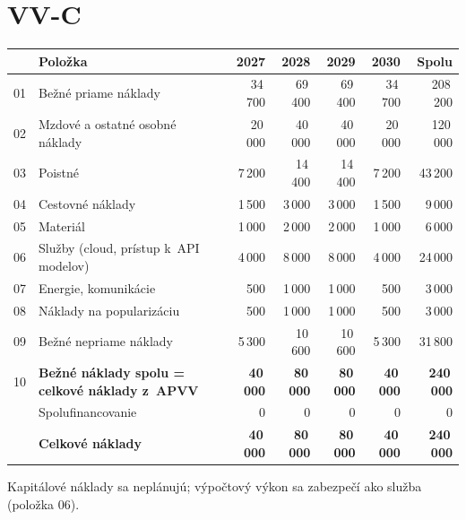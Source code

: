 \documentclass[10pt,a4paper]{article}
\begin{document}
\section*{VV-C }
\renewcommand{\arraystretch}{1.25}
\begin{tabularx}{\textwidth}{|l|X|r|r|r|r|r|}
\hline
\rowcolor{formbg} & \textbf{Položka} & \textbf{2027} & \textbf{2028} & \textbf{2029} & \textbf{2030} & \textbf{Spolu} \\ \hline
01 & Bežné priame náklady & 34\,700 & 69\,400 & 69\,400 & 34\,700 & 208\,200 \\ \hline
02 & \quad Mzdové a ostatné osobné náklady & 20\,000 & 40\,000 & 40\,000 & 20\,000 & 120\,000 \\ \hline
03 & \quad Poistné & 7\,200 & 14\,400 & 14\,400 & 7\,200 & 43\,200 \\ \hline
04 & \quad Cestovné náklady & 1\,500 & 3\,000 & 3\,000 & 1\,500 & 9\,000 \\ \hline
05 & \quad Materiál & 1\,000 & 2\,000 & 2\,000 & 1\,000 & 6\,000 \\ \hline
06 & \quad Služby (cloud, prístup k~API modelov) & 4\,000 & 8\,000 & 8\,000 & 4\,000 & 24\,000 \\ \hline
07 & \quad Energie, komunikácie & 500 & 1\,000 & 1\,000 & 500 & 3\,000 \\ \hline
08 & \quad Náklady na popularizáciu & 500 & 1\,000 & 1\,000 & 500 & 3\,000 \\ \hline
09 & Bežné nepriame náklady & 5\,300 & 10\,600 & 10\,600 & 5\,300 & 31\,800 \\ \hline
10 & \textbf{Bežné náklady spolu = celkové náklady z~APVV} & \textbf{40\,000} & \textbf{80\,000} & \textbf{80\,000} & \textbf{40\,000} & \textbf{240\,000} \\ \hline
 & Spolufinancovanie & 0 & 0 & 0 & 0 & 0 \\ \hline
 & \textbf{Celkové náklady} & \textbf{40\,000} & \textbf{80\,000} & \textbf{80\,000} & \textbf{40\,000} & \textbf{240\,000} \\ \hline
\end{tabularx}

\medskip\noindent Kapitálové náklady sa neplánujú; výpočtový výkon sa zabezpečí ako služba (položka 06).

\end{document}
